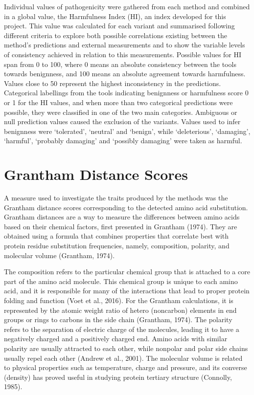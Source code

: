 \documentclass[12pt,MSc,wordcount,anon]{muthesis}
\begin{document}
\begin{flushleft}
Individual values of pathogenicity were gathered from each method and combined in a global value, the Harmfulness Index (HI), an index developed for this project. This value was calculated for each variant and summarised following different criteria to explore both possible correlations existing between the method's predictions and external measurements and to show the variable levels of consistency achieved in relation to this measurements. Possible values for HI span from 0 to 100, where 0 means an absolute consistency between the tools towards benignness, and 100 means an absolute agreement towards harmfulness. Values close to 50 represent the highest inconsistency in the predictions. Categorical labellings from the tools indicating benignness or harmfulness score 0 or 1 for the HI values, and when more than two categorical predictions were possible, they were classified in one of the two main categories. Ambiguous or null prediction values caused the exclusion of the variants. Values used to infer benignness were `tolerated', `neutral' and `benign', while `deleterious', `damaging', `harmful', `probably damaging' and `possibly damaging' were taken as harmful. 

\section{Grantham Distance Scores}

A measure used to investigate the traits produced by the methods was the Grantham distance scores corresponding to the detected amino acid substitution. Grantham distances are a way to measure the differences between amino acids based on their chemical factors, first presented in Grantham (1974). They are obtained using a formula that combines properties that correlate best with protein residue substitution frequencies, namely, composition, polarity, and molecular volume (Grantham, 1974).

The composition refers to the particular chemical group that is attached to a core part of the amino acid molecule. This chemical group is unique to each amino acid, and it is responsible for many of the interactions that lead to proper protein folding and function (Voet et al., 2016). For the Grantham calculations, it is represented by the atomic weight ratio of hetero (noncarbon) elements in end groups or rings to carbons in the side chain (Grantham, 1974). The polarity refers to the separation of electric charge of the molecules, leading it to have a negatively charged and a positively charged end. Amino acids with similar polarity are usually attracted to each other, while nonpolar and polar side chains usually repel each other (Andrew et al., 2001). The molecular volume is related to physical properties such as temperature, charge and pressure, and its converse (density) has proved useful in studying protein tertiary structure (Connolly, 1985).
 

\end{flushleft}
\end{document}
